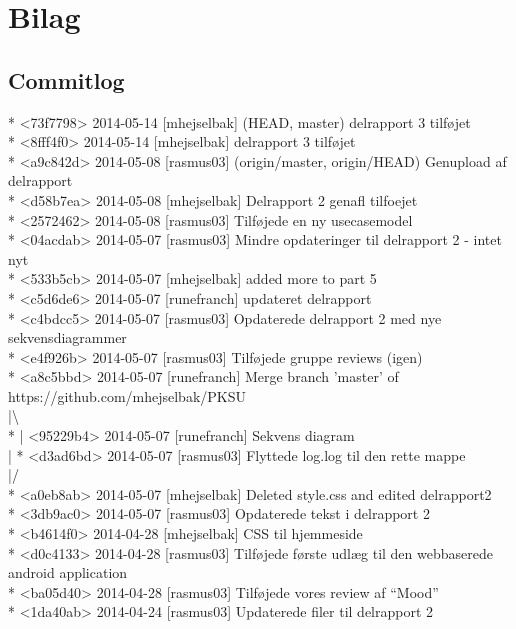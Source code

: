 \documentclass[12pt]{article}
\begin{document}
\section{Bilag}

\subsection*{Commitlog}
* <73f7798> 2014-05-14 [mhejselbak]  (HEAD, master) delrapport 3 tilføjet \\
* <8fff4f0> 2014-05-14 [mhejselbak]  delrapport 3 tilføjet \\
* <a9c842d> 2014-05-08 [rasmus03]  (origin/master, origin/HEAD) Genupload af delrapport \\
* <d58b7ea> 2014-05-08 [mhejselbak]  Delrapport 2 genafl tilfoejet \\
* <2572462> 2014-05-08 [rasmus03]  Tilføjede en ny usecasemodel \\
* <04acdab> 2014-05-07 [rasmus03]  Mindre opdateringer til delrapport 2 - intet nyt \\
* <533b5cb> 2014-05-07 [mhejselbak]  added more to part 5 \\
* <c5d6de6> 2014-05-07 [runefranch]  updateret delrapport \\
* <c4bdcc5> 2014-05-07 [rasmus03]  Opdaterede delrapport 2 med nye sekvensdiagrammer \\
* <e4f926b> 2014-05-07 [rasmus03]  Tilføjede gruppe reviews (igen) \\
*   <a8c5bbd> 2014-05-07 [runefranch]  Merge branch 'master' of https://github.com/mhejselbak/PKSU \\
|\textbackslash   \\
* | <95229b4> 2014-05-07 [runefranch]  Sekvens diagram \\
| * <d3ad6bd> 2014-05-07 [rasmus03]  Flyttede log.log til den rette mappe\\
|/  \\
* <a0eb8ab> 2014-05-07 [mhejselbak]  Deleted style.css and edited delrapport2 \\
* <3db9ac0> 2014-05-07 [rasmus03]  Opdaterede tekst i delrapport 2 \\
* <b4614f0> 2014-04-28 [mhejselbak]  CSS til hjemmeside \\
* <d0c4133> 2014-04-28 [rasmus03]  Tilføjede første udlæg til den webbaserede android application \\
* <ba05d40> 2014-04-28 [rasmus03]  Tilføjede vores review af “Mood” \\
* <1da40ab> 2014-04-24 [rasmus03]  Updaterede filer til delrapport 2 \\
\end{document}
